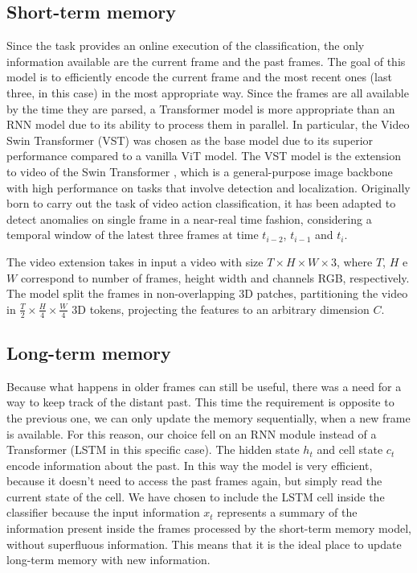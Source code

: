 \subsection{Short-term memory}

Since the task provides an online execution of the classification, the only information available are the current frame and the past frames.
The goal of this model is to efficiently encode the current frame and the most recent ones (last three, in this case) in the most appropriate way.
Since the frames are all available by the time they are parsed, a Transformer model is more appropriate than an RNN model due to its ability to process them in parallel.
In particular, the Video Swin Transformer (VST) \cite{liu_video_2022} was chosen as the base model due to its superior performance compared to a vanilla ViT \cite{DBLP:conf/iclr/DosovitskiyB0WZ21} model.
The VST model is the extension to video of the Swin Transformer \cite{liu2021Swin}, which is a general-purpose image backbone with high performance on tasks that involve detection and localization.
Originally born to carry out the task of video action classification, it has been adapted to detect anomalies on single frame in a near-real time fashion, considering a temporal window of the latest three frames at time $t_{i-2}$, $t_{i-1}$ and $t_{i}$.

The video extension takes in input a video with size $T \times H \times W \times 3$, where $T$, $H$ e $W$ correspond to number of frames, height width and channels RGB, respectively.
The model split the frames in non-overlapping 3D patches, partitioning the video in $\frac{T}{2} \times \frac{H}{4} \times \frac{W}{4}$ 3D tokens, projecting the features to an arbitrary dimension $C$.

\subsection{Long-term memory}

Because what happens in older frames can still be useful, there was a need for a way to keep track of the distant past.
This time the requirement is opposite to the previous one, we can only update the memory sequentially, when a new frame is available.
For this reason, our choice fell on an RNN module instead of a Transformer (LSTM in this specific case).
The hidden state $h_t$ and cell state $c_t$ encode information about the past.
In this way the model is very efficient, because it doesn't need to access the past frames again, but simply read the current state of the cell.
We have chosen to include the LSTM cell inside the classifier because the input information $x_t$ represents a summary of the information present inside the frames processed by the short-term memory model, without superfluous information.
This means that it is the ideal place to update long-term memory with new information.

